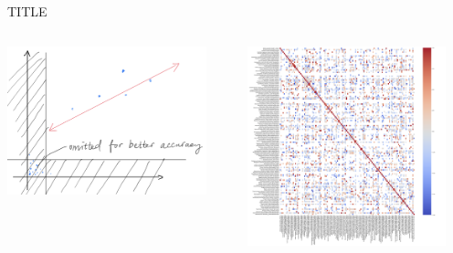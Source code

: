 \begin{frame}{TITLE}
    \begin{columns}
        \begin{column}{0.5\textwidth}
            \centering
            \includegraphics[height=0.9\textheight,width=0.9\textwidth,keepaspectratio]{images/conf_filter_explanation.jpeg}
        \end{column}
        \begin{column}{0.5\textwidth}
            \centering
            \includegraphics[height=0.9\textheight,width=0.9\textwidth,keepaspectratio]{images/confidence_filter.png}
        \end{column}
    \end{columns}
\end{frame}


